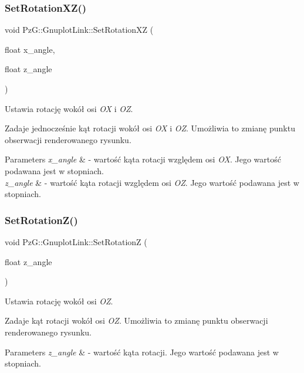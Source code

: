 \subsubsection{\texorpdfstring{Set\+Rotation\+X\+Z()}{SetRotationXZ()}}
{\footnotesize\ttfamily void Pz\+G\+::\+Gnuplot\+Link\+::\+Set\+Rotation\+XZ (\begin{DoxyParamCaption}\item[{float}]{x\+\_\+angle,  }\item[{float}]{z\+\_\+angle }\end{DoxyParamCaption})\hspace{0.3cm}{\ttfamily [inline]}}



Ustawia rotację wokół osi {\itshape OX} i {\itshape OZ}. 

Zadaje jednocześnie kąt rotacji wokół osi {\itshape OX} i {\itshape OZ}. Umożliwia to zmianę punktu obserwacji renderowanego rysunku. 
\begin{DoxyParams}{Parameters}
{\em x\+\_\+angle} & -\/ wartość kąta rotacji względem osi {\itshape OX}. Jego wartość podawana jest w stopniach. \\
\hline
{\em z\+\_\+angle} & -\/ wartość kąta rotacji względem osi {\itshape OZ}. Jego wartość podawana jest w stopniach. \\
\hline
\end{DoxyParams}
\mbox{\label{class_pz_g_1_1_gnuplot_link_a2d72e30d46e7fb61fbf70f2ea5c0d0a5}} 
\subsubsection{\texorpdfstring{Set\+Rotation\+Z()}{SetRotationZ()}}
{\footnotesize\ttfamily void Pz\+G\+::\+Gnuplot\+Link\+::\+Set\+RotationZ (\begin{DoxyParamCaption}\item[{float}]{z\+\_\+angle }\end{DoxyParamCaption})\hspace{0.3cm}{\ttfamily [inline]}}



Ustawia rotację wokół osi {\itshape OZ}. 

Zadaje kąt rotacji wokół osi {\itshape OZ}. Umożliwia to zmianę punktu obserwacji renderowanego rysunku. 
\begin{DoxyParams}{Parameters}
{\em z\+\_\+angle} & -\/ wartość kąta rotacji. Jego wartość podawana jest w stopniach. \\
\hline
\end{DoxyParams}
\mbox{\label{class_pz_g_1_1_gnuplot_link_a70d30fdb78dad112f96963a55f69e279}} 
